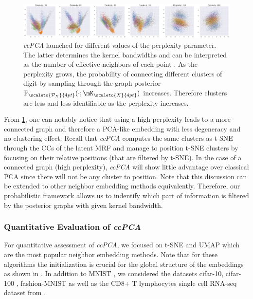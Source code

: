\begin{figure}[h]
\vskip 0.2in
\begin{center}
\centerline{\includegraphics[width=\columnwidth]{figures/GraphCoupling/multi_perp.png}}
\caption{\textit{ccPCA} launched for different values of the perplexity parameter. The latter determines the kernel bandwidths and can be interpreted as the number of effective neighbors of each point \citep{maaten2008tSNE}. As the perplexity grows, the probability of connecting different clusters of digit by sampling through the graph posterior $\mathbb{P}_{\scaleto{\mathcal{P}_X}{4pt}}(\cdot;\mK_{\scaleto{X}{4pt}})$ increases. Therefore clusters are less and less identifiable as the perplexity increases.}
\label{fig:ccPCA_perp}
\end{center}
\end{figure}

From \cref{fig:ccPCA_perp}, one can notably notice that using a high perplexity leads to a more connected graph and therefore a PCA-like embedding with less degeneracy and no clustering effect. Recall that \textit{ccPCA} computes the same clusters as t-SNE through the CCs of the latent MRF and manage to position t-SNE clusters by focusing on their relative positions (that are filtered by t-SNE). In the case of a connected graph (high perplexity), \textit{ccPCA} will show little advantage over classical PCA since there will not be any cluster to position. Note that this discussion can be extended to other neighbor embedding methods equivalently. Therefore, our probabilistic framework allows us to indentify which part of information is filtered by the posterior graphs with given kernel bandwidth.

\subsubsection{Quantitative Evaluation of \textit{ccPCA}}\label{sec:quantitative_evaluation}

For quantitative assessment of \textit{ccPCA}, we focused on t-SNE \citep{maaten2008tSNE} and UMAP \citep{mcinnes2018umap} which are the most popular neighbor embedding methods. Note that for these algorithms the initialization is crucial for the global structure of the embeddings as shown in \citep{kobak2021initialization}. In addition to MNIST \citep{deng2012mnist}, we considered the datasets cifar-10, cifar-100 \citep{krizhevsky2009cifar}, fashion-MNIST \citep{xiao2017fashion} as well as the CD8+ T lymphocytes single cell RNA-seq dataset from \citep{kurd2020early}.

